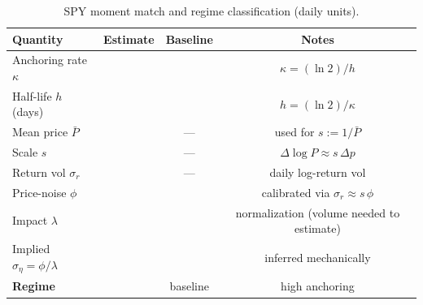 \begin{table}[t]
  \centering
  \scriptsize
  \caption{SPY moment match and regime classification (daily units).}
  \label{tab:spy_moment_match}
  \begin{tabular}{lccc}
    \toprule
    \textbf{Quantity} & \textbf{Estimate} & \textbf{Baseline} & \textbf{Notes} \\
    \midrule
    Anchoring rate $\kappa$ &  &  & $\kappa = (\ln 2)/h$ \\
    Half-life $h$ (days) &  &  & $h = (\ln 2)/\kappa$ \\
    Mean price $\bar P$ &  & --- & used for $s:=1/\bar P$ \\
    Scale $s$ &  & --- & $\Delta\log P\approx s\,\Delta p$ \\
    Return vol $\sigma_r$ &  & --- & daily log-return vol \\
    Price-noise $\phi$ &  &  & calibrated via $\sigma_r\approx s\,\phi$ \\
    Impact $\lambda$ &  &  & normalization (volume needed to estimate) \\
    Implied $\sigma_\eta=\phi/\lambda$ &  &  & inferred mechanically \\
    \midrule
    \textbf{Regime} &  & baseline & high anchoring \\
    \bottomrule
  \end{tabular}
\end{table}

